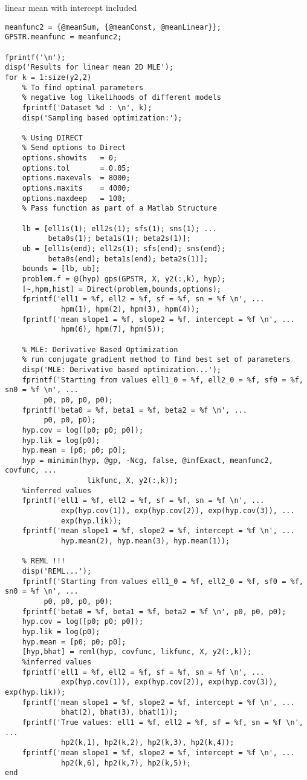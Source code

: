 \begin{par}
linear mean with intercept included
\end{par} \vspace{1em}
\begin{verbatim}
meanfunc2 = {@meanSum, {@meanConst, @meanLinear}};
GPSTR.meanfunc = meanfunc2;

fprintf('\n');
disp('Results for linear mean 2D MLE');
for k = 1:size(y2,2)
    % To find optimal parameters
    % negative log likelihoods of different models
    fprintf('Dataset %d : \n', k);
    disp('Sampling based optimization:');

    % Using DIRECT
    % Send options to Direct
    options.showits   = 0;
    options.tol       = 0.05;
    options.maxevals  = 8000;
    options.maxits    = 4000;
    options.maxdeep   = 100;
    % Pass function as part of a Matlab Structure

    lb = [ell1s(1); ell2s(1); sfs(1); sns(1); ...
          beta0s(1); beta1s(1); beta2s(1)];
    ub = [ell1s(end); ell2s(1); sfs(end); sns(end);
          beta0s(end); beta1s(end); beta2s(1)];
    bounds = [lb, ub];
    problem.f = @(hyp) gps(GPSTR, X, y2(:,k), hyp);
    [~,hpm,hist] = Direct(problem,bounds,options);
    fprintf('ell1 = %f, ell2 = %f, sf = %f, sn = %f \n', ...
             hpm(1), hpm(2), hpm(3), hpm(4));
    fprintf('mean slope1 = %f, slope2 = %f, intercept = %f \n', ...
             hpm(6), hpm(7), hpm(5));

    % MLE: Derivative Based Optimization
    % run conjugate gradient method to find best set of parameters
    disp('MLE: Derivative based optimization...');
    fprintf('Starting from values ell1_0 = %f, ell2_0 = %f, sf0 = %f, sn0 = %f \n', ...
         p0, p0, p0, p0);
    fprintf('beta0 = %f, beta1 = %f, beta2 = %f \n', ...
         p0, p0, p0);
    hyp.cov = log([p0; p0; p0]);
    hyp.lik = log(p0);
    hyp.mean = [p0; p0; p0];
    hyp = minimin(hyp, @gp, -Ncg, false, @infExact, meanfunc2, covfunc, ...
                   likfunc, X, y2(:,k));
    %inferred values
    fprintf('ell1 = %f, ell2 = %f, sf = %f, sn = %f \n', ...
             exp(hyp.cov(1)), exp(hyp.cov(2)), exp(hyp.cov(3)), ...
             exp(hyp.lik));
    fprintf('mean slope1 = %f, slope2 = %f, intercept = %f \n', ...
             hyp.mean(2), hyp.mean(3), hyp.mean(1));

    % REML !!!
    disp('REML...');
    fprintf('Starting from values ell1_0 = %f, ell2_0 = %f, sf0 = %f, sn0 = %f \n', ...
         p0, p0, p0, p0);
    fprintf('beta0 = %f, beta1 = %f, beta2 = %f \n', p0, p0, p0);
    hyp.cov = log([p0; p0; p0]);
    hyp.lik = log(p0);
    hyp.mean = [p0; p0; p0];
    [hyp,bhat] = reml(hyp, covfunc, likfunc, X, y2(:,k));
    %inferred values
    fprintf('ell1 = %f, ell2 = %f, sf = %f, sn = %f \n', ...
             exp(hyp.cov(1)), exp(hyp.cov(2)), exp(hyp.cov(3)), exp(hyp.lik));
    fprintf('mean slope1 = %f, slope2 = %f, intercept = %f \n', ...
             bhat(2), bhat(3), bhat(1));
    fprintf('True values: ell1 = %f, ell2 = %f, sf = %f, sn = %f \n', ...
             hp2(k,1), hp2(k,2), hp2(k,3), hp2(k,4));
    fprintf('mean slope1 = %f, slope2 = %f, intercept = %f \n', ...
             hp2(k,6), hp2(k,7), hp2(k,5));
end


\end{verbatim}
